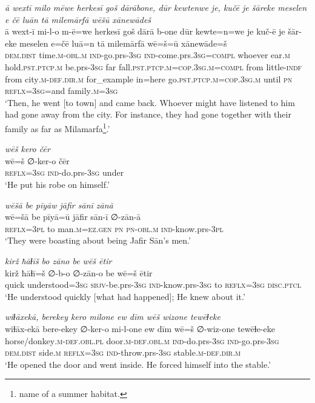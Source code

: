 \ea \label{BP.167}
\textit{ā wextī milo mēwe herkesī goš dārābone, dūr kewtenwe je, kučē je šāreke meselen e čē luān tā milemārfā wēšū xānewādeš} \\ 
\gll ā wext-ī mi-l-o m-ē=we herkesī goš dārā b-one dūr kewte=n=we je kuč-ē je šār-eke meselen e=čē luā=n tā milemārfā wē=š=ū xānewāde=š \\ 
 \textsc{dem.dist} time\textsc{.m}\textsc{-obl}\textsc{.m} \textsc{ind-}go.prs\textsc{-3sg} \textsc{ind-}come.prs\textsc{.3sg}\textsc{=compl} whoever ear\textsc{.m} hold\textsc{.pst}\textsc{.ptcp}\textsc{.m} be.prs\textsc{-3sg} far fall\textsc{.pst}\textsc{.ptcp}\textsc{.m}\textsc{=cop}\textsc{.3sg}\textsc{.m}\textsc{=compl} from little\textsc{-indf} from city\textsc{.m}\textsc{-def}\textsc{.dir}\textsc{.m} for\_example in=here go\textsc{.pst}\textsc{.ptcp}\textsc{.m}\textsc{=cop}\textsc{.3sg}\textsc{.m} until \textsc{pn} \textsc{reflx}\textsc{=3sg}=and family\textsc{.m}\textsc{=3sg} \\ 
\glt `Then, he went [to town] and came back. Whoever might have listened to him had gone away from the city. For instance, they had gone together with their family as far as Milamarfa\footnote{name of a summer habitat.}.'
\z 
 
\ea \label{BP.187}
\textit{wēš kero čēr} \\ 
\gll wē=š ∅-ker-o čēr \\ 
 \textsc{reflx}\textsc{=3sg} \textsc{ind-}do.prs\textsc{-3sg} under \\ 
\glt `He put his robe on himself.'
\z 
 
\ea \label{ŠJ.29}
\textit{wēšā be pīyāw jāfir sānī zānā} \\ 
\gll wē=šā be pīyā=ū jāfir sān-ī ∅-zān-ā \\ 
 \textsc{reflx}\textsc{=3pl} to man\textsc{.m}\textsc{=ez.gen} \textsc{pn} \textsc{pn}\textsc{-obl}\textsc{.m} \textsc{ind-}know.prs\textsc{-3pl} \\ 
\glt `They were boasting about being Jafir Sān’s men.'
\z 
 
\ea \label{ŠJ.50}
\textit{kirž ħāɫīš bo zāno be wēš ētir} \\ 
\gll kirž ħāɫī=š ∅-b-o ∅-zān-o be wē=š ētir \\ 
 quick understood\textsc{=3sg} \textsc{sbjv-}be.prs\textsc{-3sg} \textsc{ind-}know.prs\textsc{-3sg} to \textsc{reflx}\textsc{=3sg} \textsc{disc.ptcl} \\ 
\glt `He understood quickly [what had happened]; He knew about it.'
\z 
 
\ea \label{ŠJ.64}
\textit{wiɫāxekā, berekey kero milone ew dīm wēš wizone tewēɫeke} \\ 
\gll wiɫāx-ekā bere-ekey ∅-ker-o mi-l-one ew dīm wē=š ∅-wiz-one tewēɫe-eke \\ 
 horse/donkey\textsc{.m}\textsc{-def}\textsc{.obl}\textsc{.pl} door\textsc{.m}\textsc{-def}\textsc{.obl}\textsc{.m} \textsc{ind-}do.prs\textsc{-3sg} \textsc{ind-}go.prs\textsc{-3sg} \textsc{dem.dist} side\textsc{.m} \textsc{reflx}\textsc{=3sg} \textsc{ind-}throw.prs\textsc{-3sg} stable\textsc{.m}\textsc{-def}\textsc{.dir}\textsc{.m} \\ 
\glt `He opened the door and went inside. He forced himself into the stable.'
\z 
 
